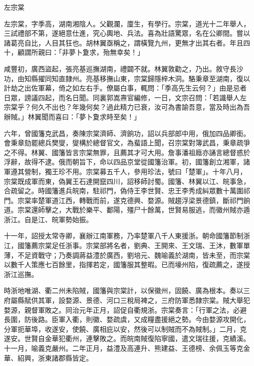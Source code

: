 
\begin{pinyinscope}
左宗棠

左宗棠，字季高，湖南湘陰人。父觀瀾，廩生，有學行。宗棠，道光十二年舉人，三試禮部不第，遂絕意仕進，究心輿地、兵法。喜為壯語驚眾，名在公卿間。嘗以諸葛亮自比，人目其狂也。胡林翼亟稱之，謂橫覽九州，更無才出其右者。年且四十，顧謂所親曰：「非夢卜夐求，殆無幸矣！」

咸豐初，廣西盜起，張亮基巡撫湖南，禮闢不就。林翼敦勸之，乃出。敘守長沙功，由知縣擢同知直隸州。亮基移撫山東，宗棠歸隱梓木洞。駱秉章至湖南，復以計劫之出佐軍幕，倚之如左右手。僚屬白事，輒問：「季高先生云何？」由是忌者日眾，謗議四起，而名日聞。同裏郭嵩燾官編修，一日，文宗召問：「若識舉人左宗棠乎？何久不出也？年幾何矣？過此精力已衰，汝可為書諭吾意，當及時出為吾辦賊。」林翼聞而喜曰：「夢卜夐求時至矣！」

六年，曾國籓克武昌，奏陳宗棠濟師、濟餉功，詔以兵部郎中用，俄加四品卿銜。會秉章劾罷總兵樊燮，燮構於總督官文，為蜚語上聞，召宗棠對簿武昌，秉章疏爭之不得。林翼、國籓皆言宗棠無罪，且薦其才可大用。詹事潘祖廕亦誦言總督惑於浮辭，故得不逮。俄而朝旨下，命以四品京堂從國籓治軍。初，國籓創立湘軍，諸軍遵其營制，獨王珍不用。宗棠募五千人，參用珍法，號曰「楚軍」。十年八月，宗棠既成軍而東，偽翼王石達開竄四川，詔移師討蜀。國籓、林翼以江、皖事急，合疏留之。時國籓進兵皖南，駐祁門，偽侍王李世賢、忠王李秀成糾眾數十萬圍祁門。宗棠率楚軍道江西，轉戰而前，遂克德興、婺源。賊趨浮梁景德鎮，斷祁門餉道。宗棠還師擊之，大戰於樂平、鄱陽，殭尸十餘萬，世賢易服逃，而徽州賊亦遁浙江。自是江、皖軍勢始振。

十一年，詔授太常寺卿，襄辦江南軍務，乃率楚軍八千人東援浙。朝命國籓節制浙江，國籓薦宗棠足任浙事。宗棠部將名者，劉典、王開來、王文瑞、王沐，數軍單薄，不足資戰守；乃奏調蔣益澧於廣西，劉培元、魏喻義於湖南，皆未至，而宗棠以數千人策應七百餘里，指揮若定，國籓服其整暇。已而壕州陷，復疏薦之，遂授浙江巡撫。

時浙地唯湖、衢二州未陷賊，國籓與宗棠計，以保徽州，固饒、廣為根本。奏以三府屬縣賦供其軍，設婺源、景德、河口三稅局裨之，三府防軍悉隸宗棠。賊大舉犯婺源，親督軍敗之。同治元年正月，詔促自衢規浙。宗棠奏言：「行軍之法，必避長圍，防後路。臣軍入衢，則徽、婺疏虞，又成糧盡援絕之勢。今由婺源攻開化，分軍扼華埠，收遂安，使饒、廣相庇以安，然後可以制賊而不為賊制。」二月，克遂安。世賢自金華犯衢州，連擊敗之。而皖南賊復陷寧國，遣文瑞往援，克績溪。十一月，喻義克嚴州。二年正月，益澧及高連升、熊建益、王德榜、余佩玉等克金華、紹興，浙東諸郡縣皆定。


\end{pinyinscope}
